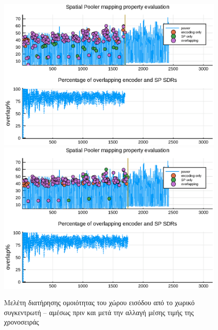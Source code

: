 	\begin{figure}[t]
		\includegraphics[width=1.1\textwidth]{figures/sp1.eps}
		\includegraphics[width=1.1\textwidth]{figures/sp2.eps}
		\caption[]{Μελέτη διατήρησης ομοιότητας του χώρου εισόδου από το χωρικό συγκεντρωτή
		-- αμέσως πριν και μετά την αλλαγή μέσης τιμής της χρονοσειράς}
	\end{figure}

